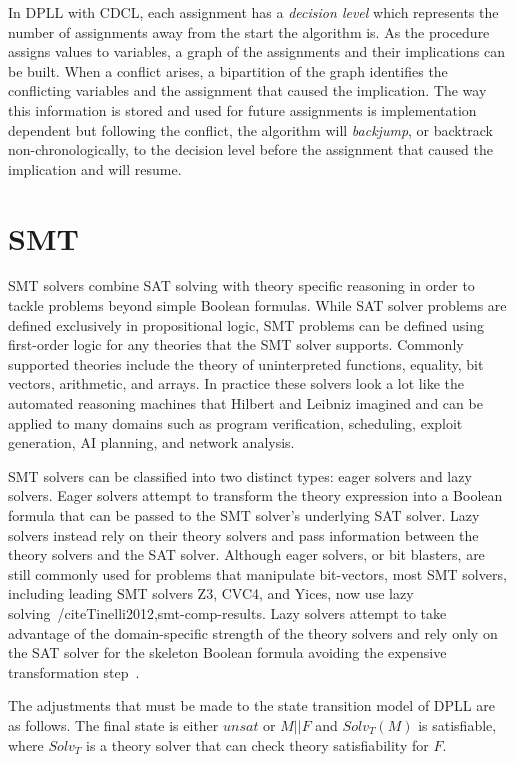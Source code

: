 \documentclass[]{final_report}
\begin{document}
In DPLL with CDCL, each assignment has a \textit{decision level} which represents the number of assignments away from the start the algorithm is. As the procedure assigns values to variables, a graph of the assignments and their implications can be built. When a conflict arises, a bipartition of the graph identifies the conflicting variables and the assignment that caused the implication. The way this information is stored and used for future assignments is implementation dependent but following the conflict, the algorithm will \textit{backjump}, or backtrack non-chronologically, to the decision level before the assignment that caused the implication and will resume.

\section{SMT}

SMT solvers combine SAT solving with theory specific reasoning in order to tackle problems beyond simple Boolean formulas. While SAT solver problems are defined exclusively in propositional logic, SMT problems can be defined using first-order logic for any theories that the SMT solver supports. Commonly supported theories include the theory of uninterpreted functions, equality, bit vectors, arithmetic, and arrays. In practice these solvers look a lot like the automated reasoning machines that Hilbert and Leibniz imagined and can be applied to many domains such as program verification, scheduling, exploit generation, AI planning, and network analysis.

SMT solvers can be classified into two distinct types: eager solvers and lazy solvers. Eager solvers attempt to transform the theory expression into a Boolean formula that can be passed to the SMT solver's underlying SAT solver. Lazy solvers instead rely on their theory solvers and pass information between the theory solvers and the SAT solver. Although eager solvers, or bit blasters, are still commonly used for problems that manipulate bit-vectors, most SMT solvers, including leading SMT solvers Z3, CVC4, and Yices, now use lazy solving~/cite{Tinelli2012,smt-comp-results}. Lazy solvers attempt to take advantage of the domain-specific strength of the theory solvers and rely only on the SAT solver for the skeleton Boolean formula avoiding the expensive transformation step~\cite{sattosmt, smtdpplt}.

The adjustments that must be made to the state transition model of DPLL are as follows. The final state is either $unsat$ or $M || F$ and $Solv _T(M)$ is satisfiable, where $Solv_T$ is a theory solver that can check theory satisfiability for $F$.
\end{document}
